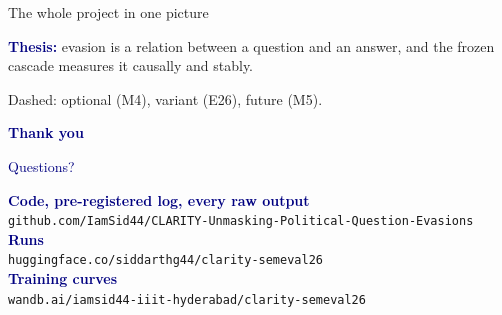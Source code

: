 \documentclass[aspectratio=169,10pt]{beamer}
\begin{document}
\begin{frame}{The whole project in one picture}
{}
  \par\vspace{2pt}
  {\footnotesize\textcolor{navy}{\textbf{Thesis:}} evasion is a relation between a question and an answer, and the frozen
  cascade measures it causally and stably.}
  \par\vspace{1pt}
  {\tiny Dashed: optional (M4), variant (E26), future (M5).}
\end{frame}

\begin{frame}
  \vfill
  \begin{center}
    {\Huge\textcolor{navy}{\textbf{Thank you}}}\par\vspace{10pt}
    {\LARGE\textcolor{navy}{Questions?}}
  \end{center}
  \vfill
  \begin{center}
    \small
    \textcolor{navy}{\textbf{Code, pre-registered log, every raw output}}\\
    \texttt{github.com/IamSid44/CLARITY-Unmasking-Political-Question-Evasions}\\[7pt]
    \textcolor{navy}{\textbf{Runs}}\\
    \texttt{huggingface.co/siddarthg44/clarity-semeval26}\\[7pt]
    \textcolor{navy}{\textbf{Training curves}}\\
    \texttt{wandb.ai/iamsid44-iiit-hyderabad/clarity-semeval26}
  \end{center}
  \vfill
\end{frame}
\end{document}
